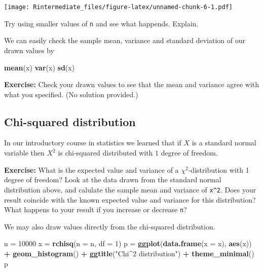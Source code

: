 \documentclass[]{article}
\newenvironment{Shaded}{\begin{snugshade}}{\end{snugshade}}
\newcommand{\KeywordTok}[1]{\textcolor[rgb]{0.13,0.29,0.53}{\textbf{#1}}}
\newcommand{\DataTypeTok}[1]{\textcolor[rgb]{0.13,0.29,0.53}{#1}}
\newcommand{\DecValTok}[1]{\textcolor[rgb]{0.00,0.00,0.81}{#1}}
\newcommand{\StringTok}[1]{\textcolor[rgb]{0.31,0.60,0.02}{#1}}
\newcommand{\OperatorTok}[1]{\textcolor[rgb]{0.81,0.36,0.00}{\textbf{#1}}}
\newcommand{\NormalTok}[1]{#1}
\begin{document}
\texttt{[image: Rintermediate\_files/figure-latex/unnamed-chunk-6-1.pdf]}

Try using smaller values of \texttt{n} and see what happends. Explain.

We can easily check the sample mean, variance and standard deviation of
our drawn values by

\begin{Shaded}
\begin{Highlighting}[]
\KeywordTok{mean}\NormalTok{(x)}
\KeywordTok{var}\NormalTok{(x)}
\KeywordTok{sd}\NormalTok{(x)}
\end{Highlighting}
\end{Shaded}

\textbf{Exercise:} Check your drawn values to see that the mean and
variance agree with what you specified. (No solution provided.)

\subsection{Chi-squared distribution}\label{chi-squared-distribution}

In our introductory course in statistics we learned that if \(X\) is a
standard normal variable then \(X^2\) is chi-squared distributed with
\(1\) degree of freedom.

\textbf{Exercise:} What is the expected value and variance of a
\(\chi^2\)-distribution with 1 degree of freedom? Look at the data drawn
from the standard normal distribution above, and calulate the sample
mean and variance of \texttt{x\^{}2}. Does your result coincide with the
known expected value and variance for this distribution? What happens to
your result if you increase or decrease \texttt{n}?

\begingroup\color{dg}

\endgroup

We may also draw values directly from the chi-squared distribution.

\begin{Shaded}
\begin{Highlighting}[]
\NormalTok{n =}\StringTok{ }\DecValTok{10000}
\NormalTok{x =}\StringTok{ }\KeywordTok{rchisq}\NormalTok{(}\DataTypeTok{n =}\NormalTok{ n, }\DataTypeTok{df =} \DecValTok{1}\NormalTok{)}
\NormalTok{p =}\StringTok{ }\KeywordTok{ggplot}\NormalTok{(}\KeywordTok{data.frame}\NormalTok{(}\DataTypeTok{x =}\NormalTok{ x), }\KeywordTok{aes}\NormalTok{(x)) }\OperatorTok{+}\StringTok{ }\KeywordTok{geom_histogram}\NormalTok{() }\OperatorTok{+}\StringTok{ }\KeywordTok{ggtitle}\NormalTok{(}\StringTok{"Chi^2 distribution"}\NormalTok{) }\OperatorTok{+}\StringTok{ }
\StringTok{    }\KeywordTok{theme_minimal}\NormalTok{()}
\NormalTok{p}
\end{Highlighting}
\end{Shaded}
\end{document}
